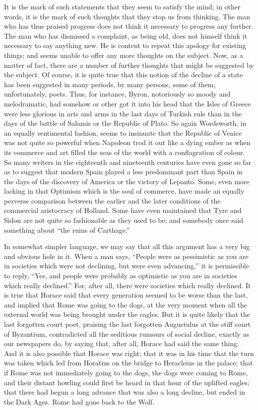 \documentclass{book}
\begin{document}
It is the mark of such statements that they seem to satisfy the mind; in other words, it is the mark of such thoughts that they stop us from thinking. The man who has thus praised progress does not think it necessary to progress any further. The man who has dismissed a complaint, as being old, does not himself think it necessary to say anything new. He is content to repeat this apology for existing things; and seems unable to offer any more thoughts on the subject. Now, as a matter of fact, there are a number of further thoughts that might be suggested by the subject. Of course, it is quite true that this notion of the decline of a state has been suggested in many periods, by many persons, some of them, unfortunately, poets. Thus, for instance, Byron, notoriously so moody and melodramatic, had somehow or other got it into his head that the Isles of Greece were less glorious in arts and arms in the last days of Turkish rule than in the days of the battle of Salamis or the Republic of Plato. So again Wordsworth, in an equally sentimental fashion, seems to insinuate that the Republic of Venice was not quite so powerful when Napoleon trod it out like a dying ember as when its commerce and art filled the seas of the world with a conflagration of colour. So many writers in the eighteenth and nineteenth centuries have even gone so far as to suggest that modern Spain played a less predominant part than Spain in the days of the discovery of America or the victory of Lepanto. Some, even more lacking in that Optimism which is the soul of commerce, have made an equally perverse comparison between the earlier and the later conditions of the commercial aristocracy of Holland. Some have even maintained that Tyre and Sidon are not quite so fashionable as they used to be; and somebody once said something about “the ruins of Carthage.”

In somewhat simpler language, we may say that all this argument has a very big and obvious hole in it. When a man says, “People were as pessimistic as you are in societies which were not declining, but were even advancing,” it is permissible to reply, “Yes, and people were probably as optimistic as you are in societies which really declined.” For, after all, there were societies which really declined. It is true that Horace said that every generation seemed to be worse than the last, and implied that Rome was going to the dogs, at the very moment when all the external world was being brought under the eagles. But it is quite likely that the last forgotten court poet, praising the last forgotten Augustulus at the stiff court of Byzantium, contradicted all the seditious rumours of social decline, exactly as our newspapers do, by saying that, after all, Horace had said the same thing. And it is also possible that Horace was right; that it was in his time that the turn was taken which led from Horatius on the bridge to Heracleius in the palace; that if Rome was not immediately going to the dogs, the dogs were coming to Rome, and their distant howling could first be heard in that hour of the uplifted eagles; that there had begun a long advance that was also a long decline, but ended in the Dark Ages. Rome had gone back to the Wolf.
\end{document}
